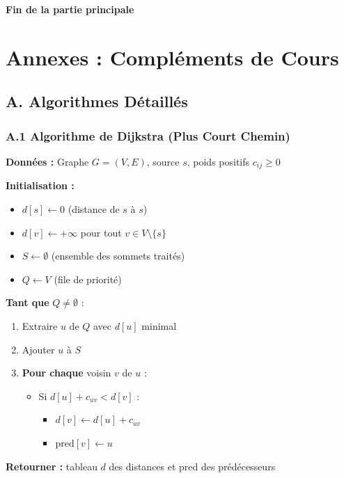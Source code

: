 \documentclass[12pt,a4paper]{article}
\begin{document}
\vspace{2em}

\begin{center}
\textcolor{titrebleu}{\Large\textbf{Fin de la partie principale}}
\end{center}

\newpage
\section*{Annexes : Compléments de Cours}

\subsection*{A. Algorithmes Détaillés}

\subsubsection*{A.1 Algorithme de Dijkstra (Plus Court Chemin)}

\begin{algorithme}
\textbf{Données :} Graphe $G = (V, E)$, source $s$, poids positifs $c_{ij} \geq 0$

\textbf{Initialisation :}
\begin{itemize}
    \item $d[s] \leftarrow 0$ (distance de $s$ à $s$)
    \item $d[v] \leftarrow +\infty$ pour tout $v \in V \setminus \{s\}$
    \item $S \leftarrow \emptyset$ (ensemble des sommets traités)
    \item $Q \leftarrow V$ (file de priorité)
\end{itemize}

\textbf{Tant que} $Q \neq \emptyset$ :
\begin{enumerate}
    \item Extraire $u$ de $Q$ avec $d[u]$ minimal
    \item Ajouter $u$ à $S$
    \item \textbf{Pour chaque} voisin $v$ de $u$ :
    \begin{itemize}
        \item Si $d[u] + c_{uv} < d[v]$ :
        \begin{itemize}
            \item $d[v] \leftarrow d[u] + c_{uv}$
            \item $\text{pred}[v] \leftarrow u$
        \end{itemize}
    \end{itemize}
\end{enumerate}

\textbf{Retourner :} tableau $d$ des distances et $\text{pred}$ des prédécesseurs
\end{algorithme}
\end{document}
